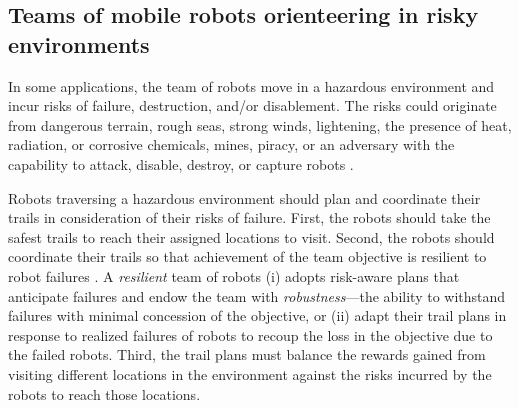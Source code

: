 \documentclass[11pt, oneside]{article}
\begin{document}
\subsection{Teams of mobile robots orienteering in risky environments} 
In some applications, the team of robots move in a hazardous environment and incur risks of failure, destruction, and/or disablement. 
The risks could originate from dangerous terrain, rough seas, strong winds, lightening, the presence of heat, radiation, or corrosive chemicals, mines, piracy, or an adversary with the capability to attack, disable, destroy, or capture robots \cite{agmon2017robotic}. 

Robots traversing a hazardous environment should plan and coordinate their trails in consideration of their risks of failure.
First, the robots should take the safest trails to reach their assigned locations to visit. 
Second, the robots should coordinate their trails so that achievement of the team objective is resilient to robot failures \cite{zhou2021multi}. 
A \emph{resilient} team of robots \cite{prorok2021beyond}
(i)
adopts risk-aware plans that anticipate failures and endow the team with \emph{robustness}---the ability to withstand failures with minimal concession of the objective,
or
(ii) adapt their trail plans in response to realized failures of robots to recoup the loss in the objective due to the failed robots. 
Third, the trail plans must balance the rewards gained from visiting different locations in the environment against the risks incurred by the robots to reach those locations.
\end{document}
